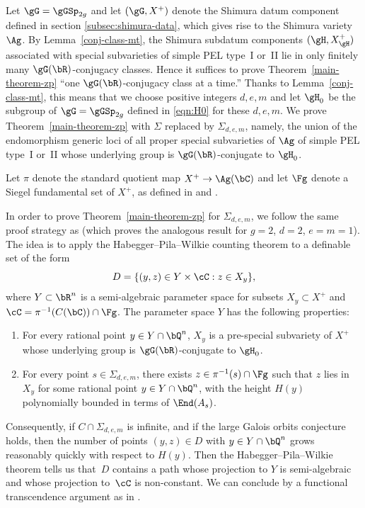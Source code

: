 Let $\gG = \gGSp_{2g}$ and let $(\gG, X^+)$ denote the Shimura datum component defined in section \ref{subsec:shimura-data}, which gives rise to the Shimura variety~$\Ag$. By Lemma~\ref{conj-class-mt}, the Shimura subdatum components $(\gH, X_\gH^+)$ associated with special subvarieties of simple PEL type~I or~II lie in only finitely many $\gG(\bR)$-conjugacy classes. Hence it suffices to prove Theorem~\ref{main-theorem-zp} ``one $\gG(\bR)$-conjugacy class at a time.''
Thanks to Lemma~\ref{conj-class-mt}, this means that we choose positive integers $d,e,m$ and let $\gH_0$ be the subgroup of $\gG = \gGSp_{2g}$ defined in \eqref{eqn:H0} for these $d,e,m$.
We prove Theorem~\ref{main-theorem-zp} with $\Sigma$ replaced by $\Sigma_{d,e,m}$, namely, the union of the endomorphism generic loci of all proper special subvarieties of $\Ag$ of simple PEL type~I or~II whose underlying group is $\gG(\bR)$-conjugate to $\gH_0$.

Let $\pi$ denote the standard quotient map $X^+ \to \Ag(\bC)$ and let $\Fg$ denote a Siegel fundamental set of $X^+$, as defined in \cite[\S2]{Orr18} and \cite[\S2.G]{ExCM}.

In order to prove Theorem~\ref{main-theorem-zp} for $\Sigma_{d,e,m}$, we follow the same proof strategy as \cite{QRTUI} (which proves the analogous result for $g=2$, $d=2$, $e=m=1$).
The idea is to apply the Habegger--Pila--Wilkie counting theorem \cite[Cor.\,7.2]{HP16} to a definable set of the form
\[
D = \{ (y,z) \in Y \times \cC : z \in X_y \},
\]
where $Y \subset \bR^n$ is a semi-algebraic parameter space for subsets $X_y \subset X^+$ and $\cC = \pi^{-1}(C(\bC)) \cap \Fg$.
The parameter space $Y$ has the following properties:
\begin{enumerate}
\item\label{enum:1D1} For every rational point $y \in Y \cap \bQ^n$, $X_y$ is a pre-special subvariety of $X^+$ whose underlying group is $\gG(\bR)$-conjugate to $\gH_0$.
\item\label{enum:1D2} For every point $s \in \Sigma_{d,e,m}$, there exists $z \in \pi^{-1}(s) \cap \Fg$ such that $z$ lies in $X_y$ for some rational point $y \in Y \cap \bQ^n$, with the height $H(y)$ polynomially bounded in terms of $\End(A_s)$.
\end{enumerate}

Consequently, if $C \cap \Sigma_{d,e,m}$ is infinite, and if the large Galois orbits conjecture holds, then the number of points $(y,z) \in D$ with $y \in Y \cap \bQ^n$ grows reasonably quickly with respect to $H(y)$.
Then the Habegger--Pila--Wilkie theorem tells us that~$D$ contains a path whose projection to $Y$ is semi-algebraic and whose projection to~$\cC$ is non-constant.
We can conclude by a functional transcendence argument as in \cite[\S6.5]{QRTUI}.

